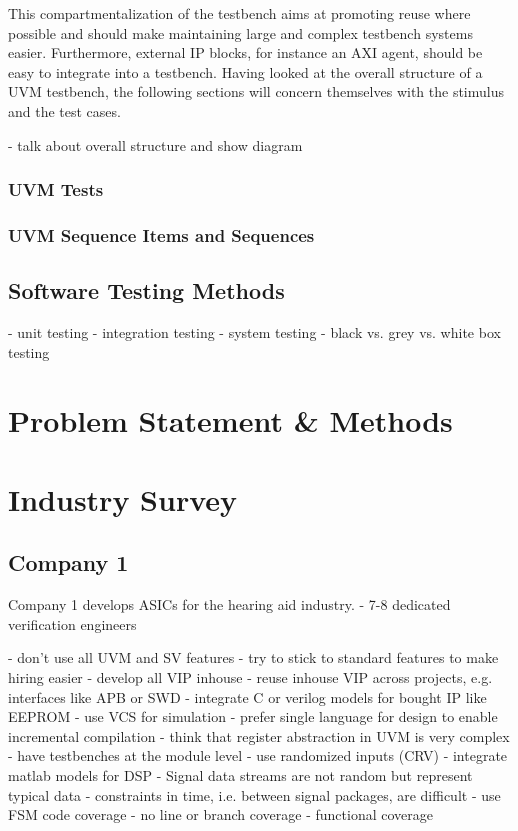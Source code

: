 \documentclass[12pt]{book}
\begin{document}
This compartmentalization of the testbench aims at promoting reuse where possible and should make maintaining large and complex testbench systems easier. Furthermore, external IP blocks, for instance an AXI agent, should be easy to integrate into a testbench. Having looked at the overall structure of a UVM testbench, the following sections will concern themselves with the stimulus and the test cases.

- talk about overall structure and show diagram

\subsection{UVM Tests}

\subsection{UVM Sequence Items and Sequences}

\section{Software Testing Methods} %
- unit testing
- integration testing
- system testing
- black vs. grey vs. white box testing

\chapter{Problem Statement \& Methods} %




\chapter{Industry Survey} %

\section{Company 1}

Company 1 develops ASICs for the hearing aid industry. 
- 7-8 dedicated verification engineers

- don't use all UVM and SV features
- try to stick to standard features to make hiring easier
- develop all VIP inhouse
- reuse inhouse VIP across projects, e.g. interfaces like APB or SWD
- integrate C or verilog models for bought IP like EEPROM 
- use VCS for simulation
- prefer single language for design to enable incremental compilation
- think that register abstraction in UVM is very complex
- have testbenches at the module level
- use randomized inputs (CRV)
- integrate matlab models for DSP
- Signal data streams are not random but represent typical data
- constraints in time, i.e. between signal packages, are difficult
- use FSM code coverage
- no line or branch coverage
- functional coverage
\end{document}

